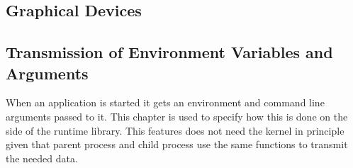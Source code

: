 \subsection{Graphical Devices}

\subsection{Transmission of Environment Variables and Arguments}
When an application is started it gets an environment and command line arguments passed to it.
This chapter is used to specify how this is done on the side of the runtime library. This features does
not need the kernel in principle given that parent process and child process use the same
functions to transmit the needed data.